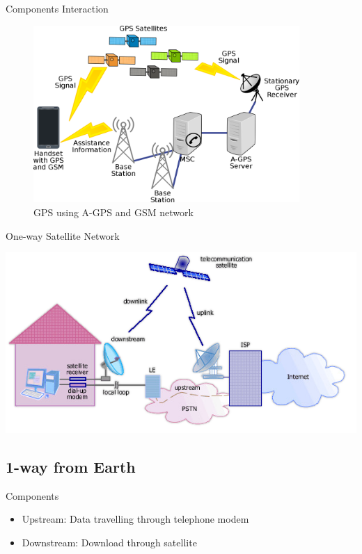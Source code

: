 \documentclass[pdf]{beamer}
\begin{document}
\begin{frame}{Components Interaction}
  \begin{figure}
    \includegraphics[width=0.9\textwidth]{A-GPS.png}
    \caption{GPS using A-GPS and GSM network}
  \end{figure}
\end{frame}


\begin{frame}{One-way Satellite Network}
\Large
  \begin{center}
    \includegraphics[width=\textwidth]{one-way-to-earth.png}
  \end{center}
\end{frame}

\subsection{1-way from Earth}
\begin{frame}{Components}\large
  \begin{itemize}
    \item Upstream: Data travelling through telephone modem
    \item Downstream: Download through satellite
  \end{itemize}
\end{frame}
\end{document}

